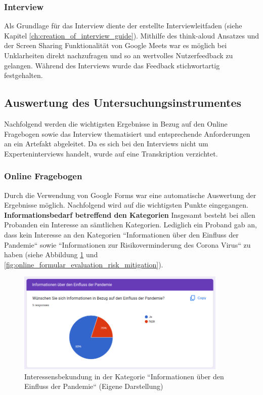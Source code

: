 \subsubsection{Interview}
Als Grundlage für das Interview diente der erstellte Interviewleitfaden (siehe Kapitel \ref{ch:creation_of_interview_guide}). Mithilfe des think-aloud Ansatzes und der Screen Sharing Funktionalität von Google Meets war es möglich bei Unklarheiten direkt nachzufragen und so an wertvolles Nutzerfeedback zu gelangen. Während des Interviews wurde das Feedback stichwortartig festgehalten.

\subsection{Auswertung des Untersuchungsinstrumentes}
Nachfolgend werden die wichtigsten Ergebnisse in Bezug auf den Online Fragebogen sowie das Interview thematisiert und entsprechende Anforderungen an ein Artefakt abgeleitet. Da es sich bei den Interviews nicht um Experteninterviews handelt, wurde auf eine Transkription verzichtet.

\subsubsection{Online Fragebogen}
Durch die Verwendung von Google Forms war eine automatische Auswertung der Ergebnisse möglich. Nachfolgend wird auf die wichtigsten Punkte eingegangen.\\

\noindent
\textbf{Informationsbedarf betreffend den Kategorien}
\newline
\indent
Insgesamt besteht bei allen Probanden ein Interesse an sämtlichen Kategorien. Lediglich ein Proband gab an, dass kein Interesse an den Kategorien ``Informationen über den Einfluss der Pandemie`` sowie ``Informationen zur Risikoverminderung des Corona Virus`` zu haben (siehe Abbildung \ref{fig:online_formular_evaluation_impact_of_covid} und \ref{fig:online_formular_evaluation_risk_mitigation}).


\begin{figure}[h]
    \includegraphics[width=10cm]{images/online_formular_evaluation_impact_of_covid.png}
    \centering
    \caption{Interessensbekundung in der Kategorie ``Informationen über den Einfluss der Pandemie`` (Eigene Darstellung)}
    \label{fig:online_formular_evaluation_impact_of_covid}
\end{figure}

